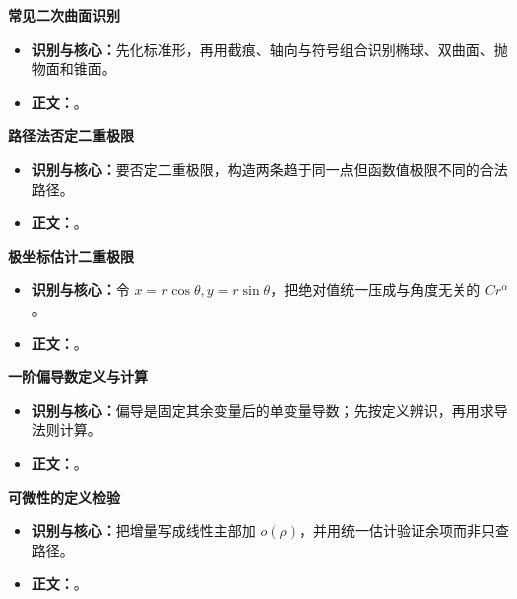 \begin{knowledgeBox}
\textbf{常见二次曲面识别}

\begin{itemize}
  \item \textbf{识别与核心：}先化标准形，再用截痕、轴向与符号组合识别椭球、双曲面、抛物面和锥面。
  \item \textbf{正文：}。
\end{itemize}

\textbf{路径法否定二重极限}

\begin{itemize}
  \item \textbf{识别与核心：}要否定二重极限，构造两条趋于同一点但函数值极限不同的合法路径。
  \item \textbf{正文：}。
\end{itemize}

\textbf{极坐标估计二重极限}

\begin{itemize}
  \item \textbf{识别与核心：}令 \(x=r\cos\theta,y=r\sin\theta\)，把绝对值统一压成与角度无关的 \(Cr^\alpha\)。
  \item \textbf{正文：}。
\end{itemize}

\textbf{一阶偏导数定义与计算}

\begin{itemize}
  \item \textbf{识别与核心：}偏导是固定其余变量后的单变量导数；先按定义辨识，再用求导法则计算。
  \item \textbf{正文：}。
\end{itemize}

\textbf{可微性的定义检验}

\begin{itemize}
  \item \textbf{识别与核心：}把增量写成线性主部加 \(o(\rho)\)，并用统一估计验证余项而非只查路径。
  \item \textbf{正文：}。
\end{itemize}


\end{knowledgeBox}
